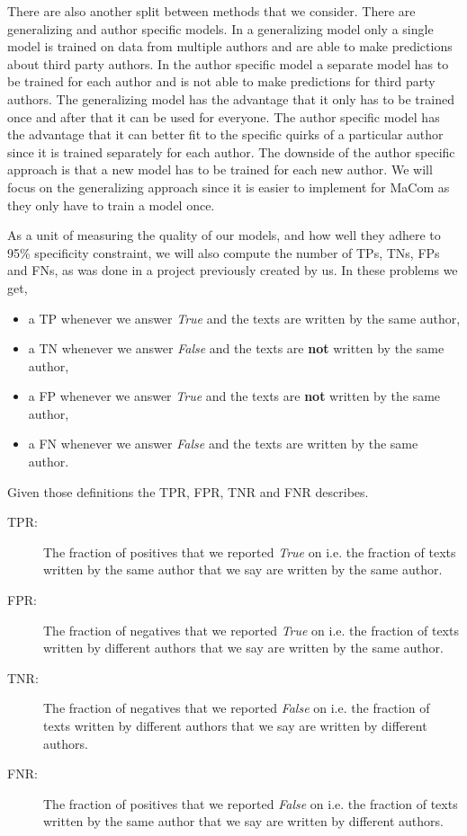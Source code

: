 There are also another split between methods that we consider. There are
generalizing and author specific models. In a generalizing model only a single
model is trained on data from multiple authors and are able to make predictions
about third party authors. In the author specific model a separate model has
to be trained for each author and is not able to make predictions for third
party authors. The generalizing model has the advantage that it only has to be
trained once and after that it can be used for everyone. The author specific
model has the advantage that it can better fit to the specific quirks of a
particular author since it is trained separately for each author. The downside
of the author specific approach is that a new model has to be trained for each
new author. We will focus on the generalizing approach since it is easier to
implement for MaCom as they only have to train a model once.

As a unit of measuring the quality of our models, and how well they adhere to
95\% specificity constraint, we will also compute the number of \gls{TP}s,
\gls{TN}s, \gls{FP}s and \gls{FN}s, as was done
in a project previously created by us. In these problems we get,

\begin{itemize}
    \item a \gls{TP} whenever we answer \textit{True} and the texts are written
        by the same author,
    \item a \gls{TN} whenever we answer \textit{False} and the texts are
        \textbf{not} written by the same author,
    \item a \gls{FP} whenever we answer \textit{True} and the texts are
        \textbf{not} written by the same author,
    \item a \gls{FN} whenever we answer \textit{False} and the texts are written
        by the same author.
\end{itemize}

Given those definitions the \gls{TPR}, \gls{FPR}, \gls{TNR} and \gls{FNR}
describes.

\begin{description}
    \item[\gls{TPR}: ] The fraction of positives that we reported \textit{True}
        on i.e. the fraction of texts written by the same author that we say are
        written by the same author.
    \item[\gls{FPR}: ] The fraction of negatives that we reported \textit{True}
        on i.e. the fraction of texts written by different authors that we say
        are written by the same author.
    \item[\gls{TNR}: ] The fraction of negatives that we reported \textit{False}
        on i.e. the fraction of texts written by different authors that we say
        are written by different authors.
    \item[\gls{FNR}: ] The fraction of positives that we reported \textit{False}
        on i.e. the fraction of texts written by the same author that we say are
        written by different authors.
\end{description}

